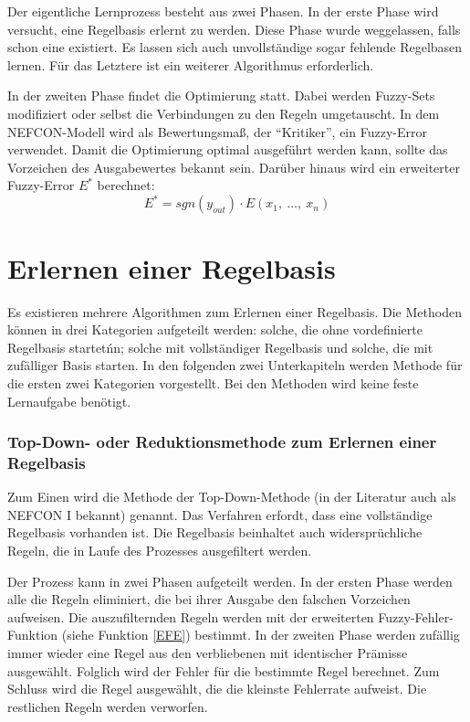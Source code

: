Der eigentliche Lernprozess besteht aus zwei Phasen. In der erste Phase wird versucht, eine Regelbasis erlernt zu werden. Diese Phase wurde weggelassen, falls schon eine existiert. Es lassen sich auch unvollständige sogar fehlende Regelbasen lernen. Für das Letztere ist ein weiterer Algorithmus erforderlich.

In der zweiten Phase findet die Optimierung statt. Dabei werden Fuzzy-Sets modifiziert oder selbst die Verbindungen zu den Regeln umgetauscht. In dem NEFCON-Modell wird als Bewertungsmaß, der ``Kritiker'', ein Fuzzy-Error verwendet. Damit die Optimierung optimal ausgeführt werden kann, sollte das Vorzeichen des Ausgabewertes bekannt sein. Darüber hinaus wird ein erweiterter Fuzzy-Error $E^*$ berechnet:
\begin{equation}\label{EFE}
E^* = sgn(y_{out})\cdot E(x_1, \ \ldots , \ x_n)
\end{equation}
\cite{CIKruse:15} \cite{UNIMAG:97}
\section{Erlernen einer Regelbasis}

Es existieren mehrere Algorithmen zum Erlernen einer Regelbasis. Die Methoden können in drei Kategorien aufgeteilt werden: solche, die ohne vordefinierte Regelbasis startetńn; solche mit vollständiger Regelbasis und solche, die mit zufälliger Basis  starten. In den folgenden zwei Unterkapiteln werden Methode für die ersten zwei Kategorien vorgestellt. Bei den Methoden wird keine feste Lernaufgabe benötigt. \cite{CIKruse:15} \cite{UNIMAG:97}%

\subsubsection{Top-Down- oder Reduktionsmethode zum Erlernen einer Regelbasis}

Zum Einen wird die Methode der Top-Down-Methode (in der Literatur auch als NEFCON I bekannt) genannt. Das Verfahren erfordt, dass eine vollständige Regelbasis vorhanden ist. Die Regelbasis beinhaltet auch widersprüchliche Regeln, die in Laufe des Prozesses ausgefiltert werden.

Der Prozess kann in zwei Phasen aufgeteilt werden. In der ersten Phase werden alle die Regeln eliminiert, die bei ihrer Ausgabe den falschen Vorzeichen aufweisen. Die auszufilternden Regeln werden mit der erweiterten Fuzzy-Fehler-Funktion (siehe Funktion \ref{EFE}) bestimmt. In der zweiten Phase werden zufällig immer wieder eine Regel aus den verbliebenen mit identischer Prämisse ausgewählt. Folglich wird der Fehler für die bestimmte Regel berechnet. Zum Schluss wird die Regel ausgewählt, die die kleinste Fehlerrate aufweist. Die restlichen Regeln werden verworfen.

